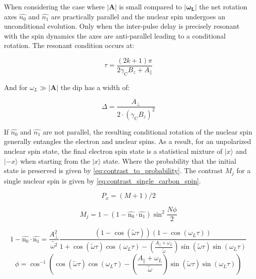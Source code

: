When considering the case where $\bm{|A|}$ is small compared to  $\bm{|\omega_L|}$ the net rotation axes  $\hat{n_0}$ and $\hat{n_1}$ are practically parallel and the nuclear spin undergoes an unconditional evolution. Only when the inter-pulse delay is precisely resonant with the spin dynamics the axes are anti-parallel leading to a conditional rotation\citep{Taminiau2012Detection}. The resonant condition occurs at:

 \begin{equation}
\tau = \frac{(2k+1)\pi}{2 \gamma_{\mathrm{C}} B_z + A_\parallel}
\label{eq:res_dip_loc}
\end{equation}

And for $\omega_L \gg |\bm{A}|$ the dip has a width of:

 \begin{equation}
\Delta = \frac{A_\perp}{2\cdot (\gamma_{\mathrm{C}} B_z)^2}
\label{eq:res_dip_width}
\end{equation}

If  $\hat{n_0}$ and $\hat{n_1}$ are not parallel, the resulting conditional rotation of the nuclear spin generally entangles the electron and nuclear spins. As a result, for an unpolarized nuclear spin state, the final electron spin state is a statistical mixture of $|x\rangle$ and $|-x\rangle$ when starting from the $|x\rangle$  state. Where the probability that the initial state is preserved is given by \cref{eq:contrast_to_probability}. The contrast $M_j$ for a single nuclear spin is given by \cref{eq:contrast_single_carbon_spin}\citep{Taminiau2012Detection}.

\begin{equation}
\label{eq:contrast_to_probability}
P_x = (M+1)/2
\end{equation}

\begin{equation}
\label{eq:contrast_single_carbon_spin}
M_j = 1-(1 - \hat{\bm{\mathrm{n_0}}} \cdot \hat{\bm{\mathrm{n_1}}}) \sin^2 \frac{N\phi}{2}
\end{equation}

\begin{equation}
\label{eq:vec_term}
    1 - \hat{\bm{\mathrm{n_0}}} \cdot \hat{\bm{\mathrm{n_1}}} =  \frac{A_\perp ^2}{\tilde{\omega^2}} \frac{(1- \cos{(\tilde{\omega} \tau)})(1-\cos{(\omega_L \tau)})} {1 +\cos{(\tilde{\omega} \tau)}\cos{(\omega_L \tau)} - (\frac{ A_ \parallel + \omega_L }{ \tilde{ \omega}}) \sin{(\tilde{\omega} \tau)}\sin{(\omega_L \tau)}}
\end{equation}
\begin{equation}
\label{eq:angle_term}
    \phi =  \cos^{-1}\left(\cos(\tilde{\omega} \tau) \cos(\omega_L \tau)-\left(\frac{ A_ \parallel + \omega_L }{ \tilde{ \omega}}\right) \sin(\tilde{\omega} \tau)\sin(\omega_L \tau)\right)
\end{equation}

